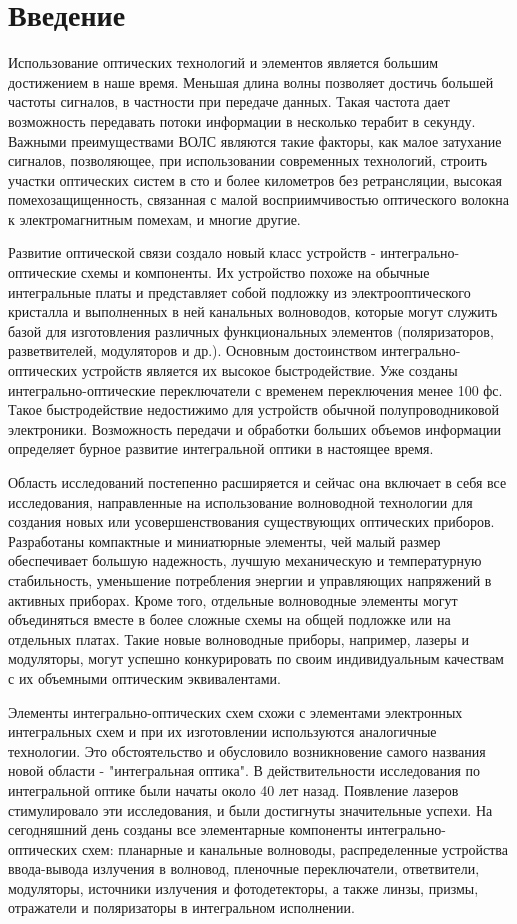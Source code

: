 \chapter*{Введение}
Использование оптических технологий и элементов является большим достижением в наше время. Меньшая длина волны позволяет достичь большей частоты сигналов, в частности при передаче данных. Такая частота дает возможность передавать потоки информации в несколько терабит в секунду. Важными преимуществами ВОЛС являются такие факторы, как малое затухание сигналов, позволяющее, при использовании современных технологий, строить участки оптических систем в сто и более километров без ретрансляции, высокая помехозащищенность, связанная с малой восприимчивостью оптического волокна к электромагнитным помехам, и многие другие.

Развитие оптической связи создало новый класс устройств - интегрально-оптические схемы и компоненты. Их устройство похоже на обычные интегральные платы и представляет собой подложку из электрооптического кристалла и выполненных в ней канальных волноводов, которые могут служить базой для изготовления различных функциональных элементов  (поляризаторов, разветвителей, модуляторов и др.). Основным достоинством интегрально-оптических устройств является их высокое быстродействие. Уже созданы интегрально-оптические  переключатели с временем переключения менее 100 фс. Такое быстродействие недостижимо для устройств обычной полупроводниковой электроники. Возможность передачи и обработки больших объемов информации определяет бурное развитие интегральной оптики в настоящее время.

Область исследований постепенно расширяется и сейчас она включает в себя все исследования, направленные на использование волноводной технологии для создания новых или усовершенствования существующих оптических приборов. Разработаны компактные и миниатюрные элементы, чей малый размер обеспечивает большую надежность, лучшую механическую и температурную стабильность, уменьшение потребления энергии и управляющих напряжений в активных приборах. Кроме того, отдельные волноводные элементы могут объединяться вместе в более сложные схемы на общей подложке или на отдельных платах. Такие новые волноводные приборы, например, лазеры и модуляторы, могут успешно конкурировать по своим индивидуальным качествам с их объемными оптическим эквивалентами.

Элементы интегрально-оптических схем схожи с элементами электронных интегральных схем и при их изготовлении используются аналогичные тех\-нологии. Это обстоятельство и обусловило возникновение самого названия новой области - "интегральная оптика". В действительности исследования по интегральной оптике были начаты около 40 лет назад. Появление лазеров стимулировало эти исследования, и были достигнуты значительные успехи. На сегодняшний день созданы все элементарные компоненты интегрально-оптических схем: планарные и канальные волноводы, распределенные устройства ввода-вывода излучения в волновод, пленочные переключатели, ответвители, модуляторы, источники излучения и фотодетекторы, а также линзы, призмы, отражатели и поляризаторы в интегральном исполнении.

